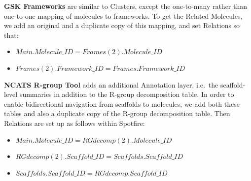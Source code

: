 \documentclass[journal=jacsat,manuscript=article]{achemso}
\newcommand*\ie{i.e.~}
\begin{document}
{\bf GSK Frameworks} are similar to Clusters, except the one-to-many rather than one-to-one mapping of molecules to frameworks. To get the Related Molecules, we add an original and a duplicate copy of this mapping, and set Relations so that:  
\begin{itemize}
\item $Main.Molecule\_ID = Frames(2).Molecule\_ID$
\item $Frames(2).Framework\_ID = Frames.Framework\_ID$
\end{itemize}

{\bf NCATS R-group Tool} adds an additional Annotation layer, \ie the scaffold-level summaries in addition to the R-group decomposition table. In order to enable bidirectional navigation from scaffolds to molecules, we add both these tables and also a duplicate copy of the R-group decomposition table. Then Relations are set up as follows within Spotfire:
\begin{itemize}
\item $Main.Molecule\_ID = RGdecomp(2).Molecule\_ID$
\item $RGdecomp(2).Scaffold\_ID = Scaffolds.Scaffold\_ID$
\item $Scaffolds.Scaffold\_ID = RGdecomp.Scaffold\_ID$
\end{itemize}   
\end{document}
